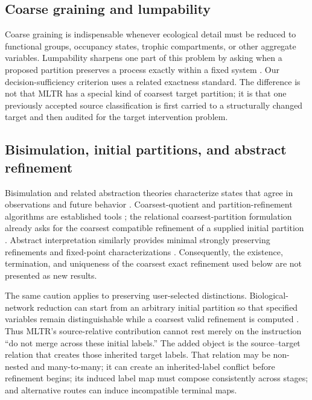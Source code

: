 \documentclass[11pt]{article}
\begin{document}
\subsection{Coarse graining and lumpability}
Coarse graining is indispensable whenever ecological detail must be reduced to functional groups, occupancy states, trophic compartments, or other aggregate variables. Lumpability sharpens one part of this problem by asking when a proposed partition preserves a process exactly within a fixed system \citep{KemenySnell1960,FeretEtAl2012}. Our decision-sufficiency criterion uses a related exactness standard. The difference is not that MLTR has a special kind of coarsest target partition; it is that one previously accepted source classification is first carried to a structurally changed target and then audited for the target intervention problem.

\subsection{Bisimulation, initial partitions, and abstract refinement}
Bisimulation and related abstraction theories characterize states that agree in observations and future behavior \citep{Milner1989,LarsenSkou1991}. Coarsest-quotient and partition-refinement algorithms are established tools \citep{PaigeTarjan1987}; the relational coarsest-partition formulation already asks for the coarsest compatible refinement of a supplied initial partition \citep{Fernandez1990}. Abstract interpretation similarly provides minimal strongly preserving refinements and fixed-point characterizations \citep{RanzatoTapparo2007}. Consequently, the existence, termination, and uniqueness of the coarsest exact refinement used below are not presented as new results.

The same caution applies to preserving user-selected distinctions. Biological-network reduction can start from an arbitrary initial partition so that specified variables remain distinguishable while a coarsest valid refinement is computed \citep{ArgyrisEtAl2023}. Thus MLTR's source-relative contribution cannot rest merely on the instruction ``do not merge across these initial labels.'' The added object is the source--target relation that creates those inherited target labels. That relation may be non-nested and many-to-many; it can create an inherited-label conflict before refinement begins; its induced label map must compose consistently across stages; and alternative routes can induce incompatible terminal maps.
\end{document}
